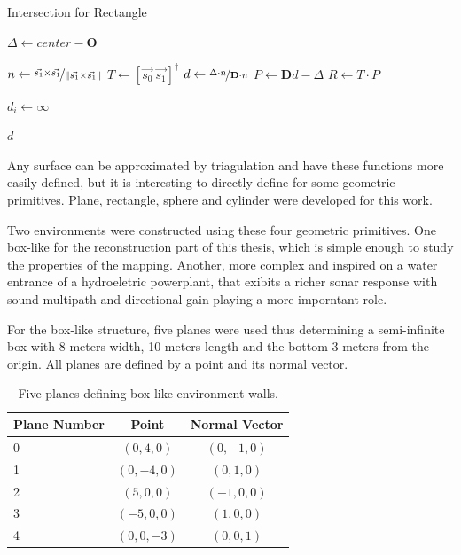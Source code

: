 \begin{algorithm}
\caption{Intersection for Rectangle}
\label{alg:rectangle}
\begin{algorithmic}

\State $\Delta \gets center -
\mathbf{O}$ 

\State $n \gets \nicefrac{\vec{s_1} \times  \vec{s_1}}{\left\lVert\vec{s_1} \times  \vec{s_1}\right\rVert}$
\State $T \gets \left[ \vec{s_0} ~ \vec{s_1} \right]^\dagger$
\State $d \gets \nicefrac{\Delta \cdot n}{\mathbf{D} \cdot n}$
\State $P \gets \mathbf{D}d - \Delta$
\State $R \gets T \cdot P$

\ForAll{$i \in \left[0,\ldots,\text{size}(d)\right)$}
\State $d_i \gets \infty$
\EndIf  
\EndFor

\Return $d$

\EndFunction
\end{algorithmic}
\end{algorithm}

Any surface can be approximated by triagulation and have these functions more
easily defined, but it is interesting to directly define for some geometric
primitives. Plane, rectangle, sphere and cylinder were developed for this work.

Two environments were constructed using these four geometric primitives. One
box-like for the reconstruction part of this thesis, which is simple enough to
study the properties of the mapping. Another, more complex and inspired on a
water entrance of a hydroeletric powerplant, that exibits a richer sonar
response with sound multipath and directional gain playing a more imporntant
role.

For the box-like structure, five planes were used thus determining a
semi-infinite box with 8 meters width, 10 meters length and the bottom 3 meters
from the origin. All planes are defined by a point and its normal vector.

\begin{table}[ht]
\centering
\begin{tabular}{lcc}
Plane Number & Point & Normal Vector \\
\hline
0 & $( 0, 4, 0)$ & $( 0,-1, 0)$  \\
1 & $( 0,-4, 0)$ & $( 0, 1, 0)$  \\
2 & $( 5, 0, 0)$ & $(-1, 0, 0)$  \\
3 & $(-5, 0, 0)$ & $( 1, 0, 0)$  \\
4 & $( 0, 0,-3)$ & $( 0, 0, 1)$  \\
\end{tabular}
\caption{Five planes defining box-like environment walls.}
\end{table}


